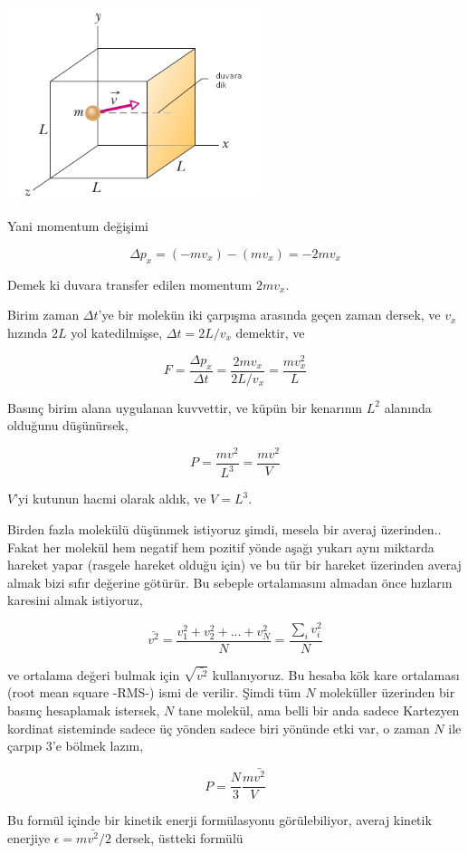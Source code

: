 \documentclass[12pt,fleqn]{article}\usepackage{../../common}
\begin{document}
\includegraphics[width=20em]{phy_005_basics_05.png}

Yani momentum değişimi

$$
\Delta p_x = (-m v_x) - (m v_x) = - 2 m v_x 
$$

Demek ki duvara transfer edilen momentum $2 m v_x$. 

Birim zaman $\Delta t$'ye bir molekün iki çarpışma arasında geçen zaman dersek,
ve $v_x$ hızında $2L$ yol katedilmişse, $\Delta t  = 2 L / v_x$ demektir, ve

$$
F = \frac{\Delta p_x}{\Delta t} = \frac{2 m v_x}{2 L / v_x} = \frac{m v_x^2}{L}
$$

Basınç birim alana uygulanan kuvvettir, ve küpün bir kenarının $L^2$ alanında
olduğunu düşünürsek, 

$$
P = \frac{m v^2}{L^3} = \frac{m v^2}{V}
$$

$V$'yi kutunun hacmi olarak aldık, ve $V = L^3$.

Birden fazla molekülü düşünmek istiyoruz şimdi, mesela bir averaj
üzerinden.. Fakat her molekül hem negatif hem pozitif yönde aşağı yukarı aynı
miktarda hareket yapar (rasgele hareket olduğu için) ve bu tür bir hareket
üzerinden averaj almak bizi sıfır değerine götürür. Bu sebeple ortalamasını
almadan önce hızların karesini almak istiyoruz,

$$
\bar{v^2} = \frac{v_1^2 + v_2^2 + ... + v_N^2 }{N} = \frac{\sum_i v_i^2}{N}
$$

ve ortalama değeri bulmak için $\sqrt{\bar{v^2}}$ kullanıyoruz. Bu hesaba kök
kare ortalaması (root mean square -RMS-) ismi de verilir. Şimdi tüm $N$
moleküller üzerinden bir basınç hesaplamak istersek, $N$ tane molekül, ama belli
bir anda sadece Kartezyen kordinat sisteminde sadece üç yönden sadece biri
yönünde etki var, o zaman $N$ ile çarpıp 3'e bölmek lazım, 

$$
P = \frac{N}{3} \frac{m \bar{v^2}}{V}
$$

Bu formül içinde bir kinetik enerji formülasyonu görülebiliyor, averaj kinetik
enerjiye $\epsilon = m \bar{v^2} / 2$ dersek, üstteki formülü
\end{document}
